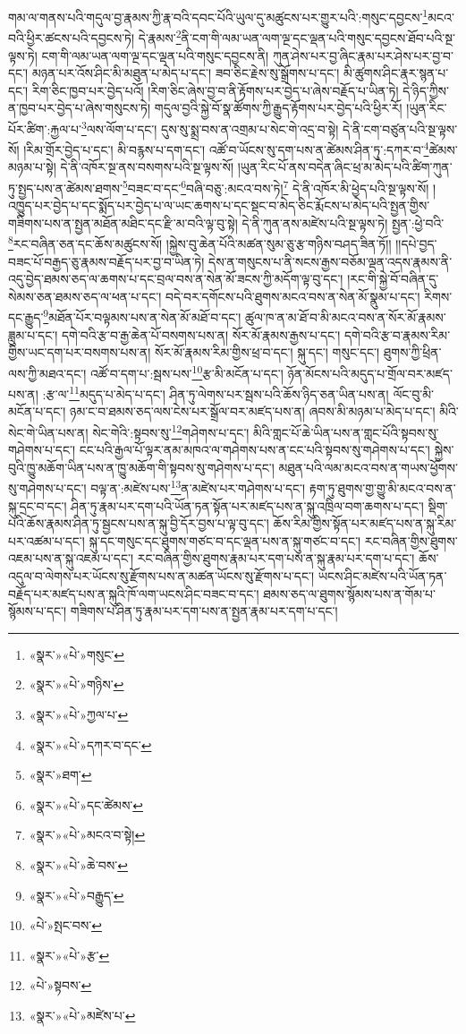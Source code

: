 གམ་ལ་གནས་པའི་གདུལ་བྱ་རྣམས་ཀྱི་རྣ་བའི་དབང་པོའི་ཡུལ་དུ་མཚུངས་པར་གྱུར་པའི་:གསུང་དབྱངས་\footnote{«སྣར་»«པེ་»གསུང་}མངའ་བའི་ཕྱིར་ཚངས་པའི་དབྱངས་ཏེ། དེ་རྣམས་\footnote{«སྣར་»«པེ་»གཉིས་}ནི་ངག་གི་ལམ་ཡན་ལག་ལྔ་དང་ལྡན་པའི་གསུང་དབྱངས་ཐོབ་པའི་སྔ་ལྟས་ཏེ། ངག་གི་ལམ་ཡན་ལག་ལྔ་དང་ལྡན་པའི་གསུང་དབྱངས་ནི། ཀུན་ཤེས་པར་བྱ་ཞིང་རྣམ་པར་ཤེས་པར་བྱ་བ་དང་། མཉན་པར་འོས་ཤིང་མི་མཐུན་པ་མེད་པ་དང་། ཟབ་ཅིང་རྗེས་སུ་སྒྲོགས་པ་དང་། མི་ཚུགས་ཤིང་རྣར་སྙན་པ་དང་། རིག་ཅིང་ཁྱབ་པར་བྱེད་པའོ། །རིག་ཅིང་ཞེས་བྱ་བ་ནི་རྟོགས་པར་བྱེད་པ་ཞེས་བརྗོད་པ་ཡིན་ཏེ། དེ་ཉིད་ཀྱིས་ན་ཁྱབ་པར་བྱེད་པ་ཞེས་གསུངས་ཏེ། གདུལ་བྱའི་སྐྱེ་བོ་སྣ་ཚོགས་ཀྱི་རྒྱུད་རྟོགས་པར་བྱེད་པའི་ཕྱིར་རོ། །ཡུན་རིང་པོར་ཚིག་:རྐྱལ་པ་\footnote{«སྣར་»«པེ་»ཀྱལ་པ་}ལས་ལོག་པ་དང་། དུས་སུ་སྨྲ་བས་ན་འགྲམ་པ་སེང་གེ་འདྲ་བ་སྟེ། དེ་ནི་ངག་བཙུན་པའི་སྔ་ལྟས་སོ། །རིམ་གྲོར་བྱེད་པ་དང་། མི་བརྙས་པ་དག་དང་། འཚོ་བ་ཡོངས་སུ་དག་པས་ན་ཚེམས་ཤིན་ཏུ་:དཀར་བ་\footnote{«སྣར་»«པེ་»དཀར་བ་དང་}ཚེམས་མཉམ་པ་སྟེ། དེ་ནི་འཁོར་སྔ་ནས་བསགས་པའི་སྔ་ལྟས་སོ། །ཡུན་རིང་པོ་ནས་བདེན་ཞིང་ཕྲ་མ་མེད་པའི་ཚིག་ཀུན་ཏུ་སྤྱད་པས་ན་ཚེམས་ཐགས་\footnote{«སྣར་»ཐག་}བཟང་བ་དང་\footnote{«སྣར་»«པེ་»དང་ཚེམས་}བཞི་བཅུ་:མངའ་བས་ཏེ།\footnote{«སྣར་»«པེ་»མངའ་བ་སྟེ།} དེ་ནི་འཁོར་མི་ཕྱེད་པའི་སྔ་ལྟས་སོ། །འཁྱུད་པར་བྱེད་པ་དང་སྨོད་པར་བྱེད་པ་ལ་ཡང་ཆགས་པ་དང་སྡང་བ་མེད་ཅིང་རྨོངས་པ་མེད་པའི་སྤྱན་གྱིས་གཟིགས་པས་ན་སྤྱན་མཐོན་མཐིང་དང་རྫི་མ་བའི་ལྟ་བུ་སྟེ། དེ་ནི་ཀུན་ནས་མཛེས་པའི་སྔ་ལྟས་ཏེ། སྤྱན་:ཕྱེ་བའི་\footnote{«སྣར་»«པེ་»ཆེ་བས་}རང་བཞིན་ཅན་དང་ཆོས་མཚུངས་སོ། །སྐྱེས་བུ་ཆེན་པོའི་མཚན་སུམ་ཅུ་རྩ་གཉིས་བཤད་ཟིན་ཏོ།། །།དཔེ་བྱད་བཟང་པོ་བརྒྱད་ཅུ་རྣམས་བརྗོད་པར་བྱ་བ་ཡིན་ཏེ། དེས་ན་གསུངས་པ་ནི་སངས་རྒྱས་བཅོམ་ལྡན་འདས་རྣམས་ནི་འདུ་བྱེད་ཐམས་ཅད་ལ་ཆགས་པ་དང་བྲལ་བས་ན་སེན་མོ་ཟངས་ཀྱི་མདོག་ལྟ་བུ་དང་། །རང་གི་སྐྱེ་བོ་བཞིན་དུ་སེམས་ཅན་ཐམས་ཅད་ལ་ཕན་པ་དང་། བདེ་བར་དགོངས་པའི་ཐུགས་མངའ་བས་ན་སེན་མོ་སྣུམ་པ་དང་། རིགས་དང་རྒྱུད་\footnote{«སྣར་»«པེ་»བརྒྱུད་}མཐོན་པོར་བལྟམས་པས་ན་སེན་མོ་མཐོ་བ་དང་། ཚུལ་ཁ་ན་མ་ཐོ་བ་མི་མངའ་བས་ན་སོར་མོ་རྣམས་ཟླུམ་པ་དང་། དགེ་བའི་རྩ་བ་རྒྱ་ཆེན་པོ་བསགས་པས་ན། སོར་མོ་རྣམས་རྒྱས་པ་དང་། དགེ་བའི་རྩ་བ་རྣམས་རིམ་གྱིས་ཡང་དག་པར་བསགས་པས་ན། སོར་མོ་རྣམས་རིམ་གྱིས་ཕྲ་བ་དང་། སྐུ་དང་། གསུང་དང་། ཐུགས་ཀྱི་ཕྲིན་ལས་ཀྱི་མཐའ་དང་། འཚོ་བ་དག་པ་:སྦས་པས་\footnote{«པེ་»སྤང་བས་}རྩ་མི་མངོན་པ་དང་། ཉོན་མོངས་པའི་མདུད་པ་གྲོལ་བར་མཛད་པས་ན། :རྩ་ལ་\footnote{«སྣར་»«པེ་»རྩ་}མདུད་པ་མེད་པ་དང་། ཤིན་ཏུ་ལེགས་པར་སྦས་པའི་ཆོས་ཉིད་ཅན་ཡིན་པས་ན། ལོང་བུ་མི་མངོན་པ་དང་། ཉམ་ང་བ་ཐམས་ཅད་ལས་ངེས་པར་སྒྲོལ་བར་མཛད་པས་ན། ཞབས་མི་མཉམ་པ་མེད་པ་དང་། མིའི་སེང་གེ་ཡིན་པས་ན། སེང་གེའི་:སྟབས་སུ་\footnote{«པེ་»སྟབས་}གཤེགས་པ་དང་། མིའི་གླང་པོ་ཆེ་ཡིན་པས་ན་གླང་པོའི་སྟབས་སུ་གཤེགས་པ་དང་། ངང་པའི་རྒྱལ་པོ་ལྟར་ནམ་མཁའ་ལ་གཤེགས་པས་ན་ངང་པའི་སྟབས་སུ་གཤེགས་པ་དང་། སྐྱེས་བུའི་ཁྱུ་མཆོག་ཡིན་པས་ན་ཁྱུ་མཆོག་གི་སྟབས་སུ་གཤེགས་པ་དང་། མཐུན་པའི་ལམ་མངའ་བས་ན་གཡས་ཕྱོགས་སུ་གཤེགས་པ་དང་། བལྟ་ན་:མཛེས་པས་\footnote{«སྣར་»«པེ་»མཛེས་པ་}ན་མཛེས་པར་གཤེགས་པ་དང་། རྟག་ཏུ་ཐུགས་གྱ་གྱུ་མི་མངའ་བས་ན་སྐུ་དྲང་བ་དང་། ཤིན་ཏུ་རྣམ་པར་དག་པའི་ཡོན་ཏན་སྟོན་པར་མཛད་པས་ན་སྐུ་འཁྲིལ་བག་ཆགས་པ་དང་། སྡིག་པའི་ཆོས་རྣམས་ཤིན་ཏུ་སྦྱངས་པས་ན་སྐུ་བྱི་དོར་བྱས་པ་ལྟ་བུ་དང་། ཆོས་རིམ་གྱིས་སྟོན་པར་མཛད་པས་ན་སྐུ་རིམ་པར་འཚམ་པ་དང་། སྐུ་དང་གསུང་དང་ཐུགས་གཙང་བ་དང་ལྡན་པས་ན་སྐུ་གཙང་བ་དང་། རང་བཞིན་གྱིས་ཐུགས་འཇམ་པས་ན་སྐུ་འཇམ་པ་དང་། རང་བཞིན་གྱིས་ཐུགས་རྣམ་པར་དག་པས་ན་སྐུ་རྣམ་པར་དག་པ་དང་། ཆོས་འདུལ་བ་ལེགས་པར་ཡོངས་སུ་རྫོགས་པས་ན་མཚན་ཡོངས་སུ་རྫོགས་པ་དང་། ཡངས་ཤིང་མཛེས་པའི་ཡོན་ཏན་བརྗོད་པར་མཛད་པས་ན་སྐུའི་ཁོ་ལག་ཡངས་ཤིང་བཟང་བ་དང་། ཐམས་ཅད་ལ་ཐུགས་སྙོམས་པས་ན་གོམ་པ་སྙོམས་པ་དང་། གཟིགས་པ་ཤིན་ཏུ་རྣམ་པར་དག་པས་ན་སྤྱན་རྣམ་པར་དག་པ་དང་། 